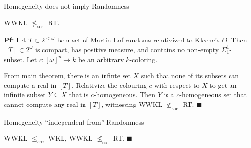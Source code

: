 \begin{frame}{Homogeneity does not imply Randomness}
  \begin{theorem}
    WWKL $\nleq_{\text{soc}}$ RT.
  \end{theorem}

  \vspace{1em}
  \textbf{Pf:} Let $T\subset2^{<\omega}$ be a set of Martin-Lof
  randoms relativized to Kleene's $O$. Then $[T]\subset 2^\omega$ is
  compact, has positive measure, and contains no non-empty
  $\Sigma_1^1$-subset. Let $c:[\omega]^n\rightarrow k$ be an arbitrary
  $k$-coloring.
  
  \vspace{1em}
  From main theorem, there is an infinte set $X$ such that none of its
  subsets can compute a real in $[T]$. Relativize the colouring $c$ with
  respect to $X$ to get an infinite subset $Y\subseteq X$ that is
  $c$-homogeneous. Then $Y$ is a $c$-homogeneous set that cannot compute
  any real in $[T]$, witnessing WWKL $\nleq_{\text{soc}}$ RT.
  $\blacksquare$
\end{frame}

\begin{frame}{Homogeneity ``independent from'' Randomness}
  \begin{coro}
    WWKL $\leq_{soc}$ WKL, WWKL $\nleq_{\text{soc}}$ RT. $\blacksquare$
  \end{coro}

  \vspace{2em}
  \begin{center}
  \end{center}
\end{frame}
